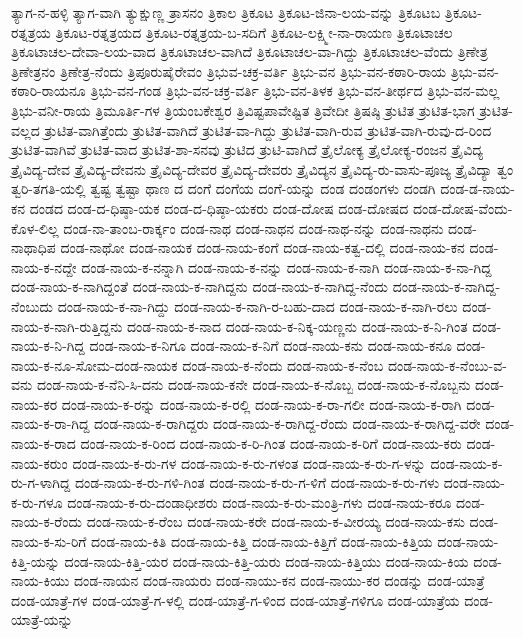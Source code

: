 ತ್ಯಾಗ-ನ-ಹಳ್ಳಿ
ತ್ಯಾಗ-ವಾಗಿ
ತ್ಯುಕ್ಷುಣ್ಣ
ತ್ರಾಸನಂ
ತ್ರಿಕಾಲ
ತ್ರಿಕೂಟ
ತ್ರಿಕೂಟ-ಜಿನಾ-ಲಯ-ವನ್ನು
ತ್ರಿಕೂಟಬ
ತ್ರಿಕೂಟ-ರತ್ನತ್ರಯ
ತ್ರಿಕೂಟ-ರತ್ನತ್ರಯದ
ತ್ರಿಕೂಟ-ರತ್ನತ್ರಯ-ಬ-ಸದಿಗೆ
ತ್ರಿಕೂಟ-ಲಕ್ಷ್ಮೀ-ನಾ-ರಾಯಣ
ತ್ರಿಕೂಟಾಚಲ
ತ್ರಿಕೂಟಾಚಲ-ದೇವಾ-ಲಯ-ವಾದ
ತ್ರಿಕೂಟಾಚಲ-ವಾಗಿದೆ
ತ್ರಿಕೂಟಾಚಲ-ವಾ-ಗಿದ್ದು
ತ್ರಿಕೂಟಾಚಲ-ವೆಂದು
ತ್ರಿಣೇತ್ರ
ತ್ರಿಣೇತ್ರನಂ
ತ್ರಿಣೇತ್ರ-ನೆಂದು
ತ್ರಿಪೂರುಷೈರೇವಂ
ತ್ರಿಭುವ-ಚಕ್ರ-ವರ್ತಿ
ತ್ರಿಭು-ವನ
ತ್ರಿಭು-ವನ-ಕಠಾರಿ-ರಾಯ
ತ್ರಿಭು-ವನ-ಕಠಾರಿ-ರಾಯನೂ
ತ್ರಿಭು-ವನ-ಗಂಡ
ತ್ರಿಭು-ವನ-ಚಕ್ರ-ವರ್ತಿ
ತ್ರಿಭು-ವನ-ತಿಳಕ
ತ್ರಿಭು-ವನ-ತೀರ್ಥದ
ತ್ರಿಭು-ವನ-ಮಲ್ಲ
ತ್ರಿಭು-ವನೀ-ರಾಯ
ತ್ರಿಮೂರ್ತಿ-ಗಳ
ತ್ರಿಯಂಬಕೇಶ್ವರ
ತ್ರಿವಿಷ್ಟಪಾವೇಷ್ಟಿತ
ತ್ರಿವೇದೀ
ತ್ರಿಷಷ್ಠಿ
ತ್ರುಟಿತ
ತ್ರುಟಿತ-ಭಾಗ
ತ್ರುಟಿತ-ವಲ್ಲದ
ತ್ರುಟಿತ-ವಾಗಿತ್ತೆಂದು
ತ್ರುಟಿತ-ವಾಗಿದೆ
ತ್ರುಟಿತ-ವಾ-ಗಿದ್ದು
ತ್ರುಟಿತ-ವಾಗಿ-ರುವ
ತ್ರುಟಿತ-ವಾಗಿ-ರುವು-ದ-ರಿಂದ
ತ್ರುಟಿತ-ವಾಗಿವೆ
ತ್ರುಟಿತ-ವಾದ
ತ್ರುಟಿತ-ಶಾ-ಸನವು
ತ್ರುಟಿದ
ತ್ರುಟಿ-ವಾಗಿದೆ
ತ್ರೈಲೋಕ್ಯ
ತ್ರೈಲೋಕ್ಯ-ರಂಜನ
ತ್ರೈವಿದ್ಯ
ತ್ರೈವಿದ್ಯ-ದೇವ
ತ್ರೈವಿದ್ಯ-ದೇವನು
ತ್ರೈವಿದ್ಯ-ದೇವರ
ತ್ರೈವಿದ್ಯ-ದೇವರು
ತ್ರೈವಿದ್ಯನ
ತ್ರೈವಿದ್ಯ-ರು-ವಾಸು-ಪೂಜ್ಯ
ತ್ರೈವಿದ್ಯಾ
ತ್ವಂ
ತ್ವರಿ-ತಗತಿ-ಯಲ್ಲಿ
ತ್ವಷ್ಟ
ತ್ವಷ್ಟಾ
ಥಾಣ
ದ
ದಂಗೆ
ದಂಗೆಯ
ದಂಗೆ-ಯನ್ನು
ದಂಡ
ದಂಡಂಗಳು
ದಂಡಗಿ
ದಂಡ-ಡ-ನಾಯ-ಕನ
ದಂಡದ
ದಂಡ-ದ-ಧಿಷ್ಠಾ-ಯಕ
ದಂಡ-ದ-ಧಿಷ್ಠಾ-ಯಕರು
ದಂಡ-ದೋಷ
ದಂಡ-ದೋಷದ
ದಂಡ-ದೋಷ-ವೆಂದು-ಕೊಳ-ಲಿಲ್ಲ
ದಂಡ-ನಾ-ತಾಂಬ-ರಾರ್ಕ್ಕಂ
ದಂಡ-ನಾಥ
ದಂಡ-ನಾಥನ
ದಂಡ-ನಾಥ-ನನ್ನು
ದಂಡ-ನಾಥನು
ದಂಡ-ನಾಥಾಧಿಪ
ದಂಡ-ನಾಥೋ
ದಂಡ-ನಾಯಕ
ದಂಡ-ನಾಯ-ಕಂಗೆ
ದಂಡ-ನಾಯ-ಕತ್ವ-ದಲ್ಲಿ
ದಂಡ-ನಾಯ-ಕನ
ದಂಡ-ನಾಯ-ಕ-ನದ್ದೇ
ದಂಡ-ನಾಯ-ಕ-ನನ್ನಾಗಿ
ದಂಡ-ನಾಯ-ಕ-ನನ್ನು
ದಂಡ-ನಾಯ-ಕ-ನಾಗಿ
ದಂಡ-ನಾಯ-ಕ-ನಾ-ಗಿದ್ದ
ದಂಡ-ನಾಯ-ಕ-ನಾಗಿದ್ದಂತೆ
ದಂಡ-ನಾಯ-ಕ-ನಾಗಿದ್ದನು
ದಂಡ-ನಾಯ-ಕ-ನಾಗಿದ್ದ-ನೆಂದು
ದಂಡ-ನಾಯ-ಕ-ನಾಗಿದ್ದ-ನೆಂಬುದು
ದಂಡ-ನಾಯ-ಕ-ನಾ-ಗಿದ್ದು
ದಂಡ-ನಾಯ-ಕ-ನಾಗಿ-ರ-ಬಹು-ದಾದ
ದಂಡ-ನಾಯ-ಕ-ನಾಗಿ-ರಲು
ದಂಡ-ನಾಯ-ಕ-ನಾಗಿ-ರುತ್ತಿದ್ದನು
ದಂಡ-ನಾಯ-ಕ-ನಾದ
ದಂಡ-ನಾಯ-ಕ-ನಿಕ್ಕ-ಯಣ್ಣನು
ದಂಡ-ನಾಯ-ಕ-ನಿ-ಗಿಂತ
ದಂಡ-ನಾಯ-ಕ-ನಿ-ಗಿದ್ದ
ದಂಡ-ನಾಯ-ಕ-ನಿಗೂ
ದಂಡ-ನಾಯ-ಕ-ನಿಗೆ
ದಂಡ-ನಾಯ-ಕನು
ದಂಡ-ನಾಯ-ಕನೂ
ದಂಡ-ನಾಯ-ಕ-ನೂ-ಸೋಮ-ದಂಡ-ನಾಯಕ
ದಂಡ-ನಾಯ-ಕ-ನೆಂದು
ದಂಡ-ನಾಯ-ಕ-ನೆಂಬ
ದಂಡ-ನಾಯ-ಕ-ನೆಂಬು-ವ-ವನು
ದಂಡ-ನಾಯ-ಕ-ನೆನಿ-ಸಿ-ದನು
ದಂಡ-ನಾಯ-ಕನೇ
ದಂಡ-ನಾಯ-ಕ-ನೊಬ್ಬ
ದಂಡ-ನಾಯ-ಕ-ನೊಬ್ಬನು
ದಂಡ-ನಾಯ-ಕರ
ದಂಡ-ನಾಯ-ಕ-ರನ್ನು
ದಂಡ-ನಾಯ-ಕ-ರಲ್ಲಿ
ದಂಡ-ನಾಯ-ಕ-ರಾ-ಗಲೀ
ದಂಡ-ನಾಯ-ಕ-ರಾಗಿ
ದಂಡ-ನಾಯ-ಕ-ರಾ-ಗಿದ್ದ
ದಂಡ-ನಾಯ-ಕ-ರಾಗಿದ್ದರು
ದಂಡ-ನಾಯ-ಕ-ರಾಗಿದ್ದ-ರೆಂದು
ದಂಡ-ನಾಯ-ಕ-ರಾಗಿದ್ದ-ವರೇ
ದಂಡ-ನಾಯ-ಕ-ರಾದ
ದಂಡ-ನಾಯ-ಕ-ರಿಂದ
ದಂಡ-ನಾಯ-ಕ-ರಿ-ಗಿಂತ
ದಂಡ-ನಾಯ-ಕ-ರಿಗೆ
ದಂಡ-ನಾಯ-ಕರು
ದಂಡ-ನಾಯ-ಕರುಂ
ದಂಡ-ನಾಯ-ಕ-ರು-ಗಳ
ದಂಡ-ನಾಯ-ಕ-ರು-ಗಳಂತ
ದಂಡ-ನಾಯ-ಕ-ರು-ಗ-ಳನ್ನು
ದಂಡ-ನಾಯ-ಕ-ರು-ಗ-ಳಾಗಿದ್ದ
ದಂಡ-ನಾಯ-ಕ-ರು-ಗಳಿ-ಗಿಂತ
ದಂಡ-ನಾಯ-ಕ-ರು-ಗ-ಳಿಗೆ
ದಂಡ-ನಾಯ-ಕ-ರು-ಗಳು
ದಂಡ-ನಾಯ-ಕ-ರು-ಗಳೂ
ದಂಡ-ನಾಯ-ಕ-ರು-ದಂಡಾಧೀಶರು
ದಂಡ-ನಾಯ-ಕ-ರು-ಮಂತ್ರಿ-ಗಳು
ದಂಡ-ನಾಯ-ಕರೂ
ದಂಡ-ನಾಯ-ಕ-ರೆಂದು
ದಂಡ-ನಾಯ-ಕ-ರೆಂಬ
ದಂಡ-ನಾಯ-ಕರೇ
ದಂಡ-ನಾಯ-ಕ-ವೀರಯ್ಯ
ದಂಡ-ನಾಯ-ಕಸು
ದಂಡ-ನಾಯ-ಕ-ಸು-ರಿಗೆ
ದಂಡ-ನಾಯ-ಕಿತಿ
ದಂಡ-ನಾಯ-ಕಿತ್ತಿ
ದಂಡ-ನಾಯ-ಕಿತ್ತಿಗೆ
ದಂಡ-ನಾಯ-ಕಿತ್ತಿಯ
ದಂಡ-ನಾಯ-ಕಿತ್ತಿ-ಯನ್ನು
ದಂಡ-ನಾಯ-ಕಿತ್ತಿ-ಯರ
ದಂಡ-ನಾಯ-ಕಿತ್ತಿ-ಯರು
ದಂಡ-ನಾಯ-ಕಿತ್ತಿಯು
ದಂಡ-ನಾಯ-ಕಿಯ
ದಂಡ-ನಾಯ-ಕಿಯು
ದಂಡ-ನಾಯನ
ದಂಡ-ನಾಯರು
ದಂಡ-ನಾಯು-ಕನ
ದಂಡ-ನಾಯು-ಕರ
ದಂಡನ್ನು
ದಂಡ-ಯಾತ್ರೆ
ದಂಡ-ಯಾತ್ರೆ-ಗಳ
ದಂಡ-ಯಾತ್ರೆ-ಗ-ಳಲ್ಲಿ
ದಂಡ-ಯಾತ್ರೆ-ಗ-ಳಿಂದ
ದಂಡ-ಯಾತ್ರೆ-ಗಳಿಗೂ
ದಂಡ-ಯಾತ್ರೆಯ
ದಂಡ-ಯಾತ್ರೆ-ಯನ್ನು
